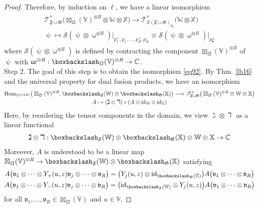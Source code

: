 \documentclass[11pt,b5paper,notitlepage]{article}
\theoremstyle{definition}
\theoremstyle{plain}
\newcommand{\fk}{\mathfrak}
\newcommand{\Hom}{\mathrm{Hom}}
\newcommand{\blt}{\bullet}
\newcommand{\Vbb}{\mathbb V}
\newcommand{\Xbb}{\mathbb X}
\newcommand{\Wbb}{\mathbb W}
\newcommand{\Cbb}{\mathbb C}
\newcommand{\<}{\left\langle}
\renewcommand{\>}{\right\rangle}
\newcommand{\ST}{\mathscr{T}}
\newcommand{\MS}{\mathcal{S}}
\newcommand{\bbs}{\boxbackslash}
\newcommand{\fq}{{\mathfrak Q}}
\newcommand{\id}{\mathrm{id}}
\newcommand{\ff}{\mathfrak{F}}
\newcommand{\fg}{\mathfrak{G}}
\numberwithin{equation}{section}
\begin{document}
\begin{proof}
Therefore, by induction on $\ell$, we have a linear isomorphism
\begin{gather}\label{eq91}
\begin{gathered}
\ST^*_{\ff\sqcup\fg}\big(\boxtimes_\fq(\Vbb)^{\otimes R}\otimes\Wbb\otimes\Xbb\big)\longrightarrow \ST^*_{\MS(\ff\sqcup\fg)_{p_\blt}}\big(\Wbb\otimes\Xbb\big)\\
\uppsi\mapsto \MS(\uppsi\otimes\upomega^{\otimes R})\big|_{p^+_1,p^-_1,\dots,p^+_R,p^-_R}\equiv \MS(\uppsi\otimes\upomega^{\otimes R})\big|_{p^\pm_\blt}
\end{gathered}
\end{gather}
where $\MS(\uppsi\otimes\upomega^{\otimes R})$ is defined by contracting the component $\boxtimes_\fq(\Vbb)^{\otimes R}$ of $\uppsi$ with $\upomega^{\otimes R}:\bbs_\fq(\Vbb)^{\otimes R}\rightarrow\Cbb$.\\[-1ex]


Step 2. The goal of this step is to obtain the isomorphism \eqref{eq92}. By Thm. \ref{lb16} and the universal property for dual fusion products, we have an isomorphism
\begin{gather}\label{eq98}
\begin{gathered}
\Hom_{\Vbb^{\otimes(2R)}}\big(\boxtimes_\fq(\Vbb)^{\otimes R},\bbs_\ff(\Wbb)\otimes\bbs_\fg(\Xbb) \big)\longrightarrow \ST^*_{\ff\sqcup\fg}\big(\boxtimes_\fq(\Vbb)^{\otimes R}\otimes\Wbb\otimes\Xbb\big)\\
A\mapsto (\gimel\otimes\daleth)\circ (A\otimes\id_\Wbb\otimes\id_\Xbb)
\end{gathered}
\end{gather}
Here, by reordering the tensor components in the domain, we view $\gimel\otimes\daleth$ as a linear functional
\begin{align*}
\gimel\otimes\daleth:\bbs_\ff(\Wbb)\otimes\bbs_\fg(\Xbb)\otimes\Wbb\otimes\Xbb\rightarrow\Cbb
\end{align*}
Moreover, $A$ is understood to be a linear map $\boxtimes_\fq(\Vbb)^{\otimes R}\rightarrow\bbs_\ff(\Wbb)\otimes\bbs_\fg(\Xbb)$ satisfying
\begin{gather*}
A\big(\fk v_1\otimes\cdots\otimes Y_+(u,z)\fk v_j\otimes\cdots\otimes\fk v_R\big)=\big(Y_j(u,z)\otimes\id_{\bbs_\fg(\Xbb)}\big)A\big(\fk v_1\otimes\cdots\otimes\fk v_R\big)\\
A\big(\fk v_1\otimes\cdots\otimes Y_-(u,z)\fk v_j\otimes\cdots\otimes\fk v_R\big)=\big(\id_{\bbs_\ff(\Wbb)}\otimes Y_j(u,z)\big)A\big(\fk v_1\otimes\cdots\otimes\fk v_R\big)
\end{gather*}
for all $\fk v_1,\dots,\fk v_R\in\boxtimes_\fq(\Vbb)$ and $u\in\Vbb$.


\end{proof}
\end{document}
